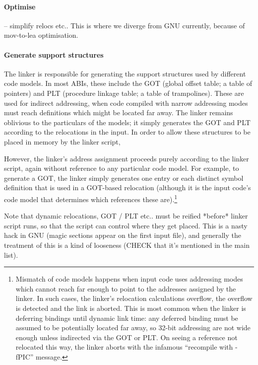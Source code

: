 \paragraph{Optimise}   -- simplify relocs etc.. 
This is where we diverge from GNU currently, because of mov-to-lea optimisation.
 

\paragraph{Generate support structures}
The linker is responsible for generating the support structures used by different code models.
In most ABIs, these include the GOT (global offset table; a table of pointers) and PLT 
(procedure linkage table; a table of trampolines).
These are used for indirect addressing, when code compiled with narrow addressing modes
must reach definitions which might be located far away.
The linker remains oblivious to the particulars of the models;
it simply generates the GOT and PLT according to the relocations in the input.
In order to allow these structures to be placed in memory by the linker script, 

However, the linker's address assignment proceeds purely according to the linker script, 
again without reference to any particular code model.
For example, to generate a GOT, the linker simply generates one entry 
or each distinct symbol definition that is used in a GOT-based relocation
(although it is the input code's code model that determines which references these are).\footnote{Mismatch of code models happens when input code uses addressing modes which cannot reach far enough 
to point to the addresses assigned by the linker.
In such cases, the linker's relocation calculations overflow, the overflow is detected
and the link is aborted.
This is most common when the linker is deferring bindings until dynamic link time: 
any deferred binding must be assumed to be potentially located far away,
so 32-bit addressing are not wide enough unless indirected via the GOT or PLT.
On seeing a reference not relocated this way, 
the linker aborts with the infamous ``recompile with \textsf{-fPIC}'' message.}


Note that dynamic relocations, GOT / PLT etc.. must be reified *before* linker script runs, 
so that the script can control where they get placed.
This is a nasty hack in GNU (magic sections appear on the first input file), 
and generally the treatment of this is a kind of looseness (CHECK that it's mentioned
in the main list).

